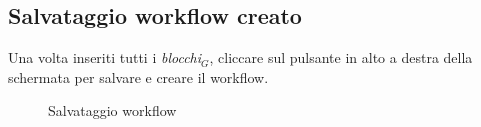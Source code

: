 \subsection{Salvataggio workflow creato} \label{saveWorkflow}
Una volta inseriti tutti i \textit{blocchi$_{G}$}, cliccare sul pulsante in alto a destra della schermata per salvare e creare il workflow. \\
	\begin{figure}[!ht]
		\centering
		\caption{Salvataggio workflow}
	\end{figure}
